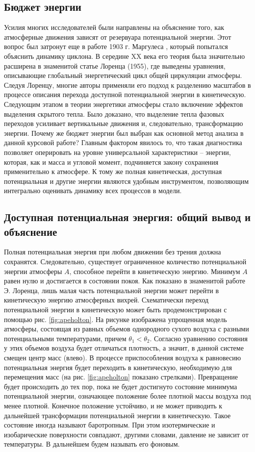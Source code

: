 \documentclass[12pt,a4paper]{report}
\begin{document}
\subsection{Бюджет энергии}
Усилия многих исследователей были направлены на объяснение того, как атмосферные движения зависят от резервуара потенциальной энергии. Этот вопрос был затронут еще в работе 1903 г. Маргулеса \citep{Nagata1993}, который попытался объяснить динамику циклона. В середине XX века его теория была значительно расширена в знаменитой статье Лоренца (1955), где выведены уравнения, описывающие глобальный энергетический цикл общей циркуляции атмосферы. Следуя Лоренцу, многие авторы применяли его подход к разделению масштабов в процессе описания перехода доступной потенциальной энергии в кинетическую. Следующим этапом в теории энергетики атмосферы стало включение эффектов выделения скрытого тепла. Было доказано, что выделение тепла фазовых переходов усиливает вертикальные движения и, следовательно, трансформацию энергии.
Почему же бюджет энергии был выбран как основной метод анализа в данной курсовой работе? Главным фактором явилось то, что такая диагностика позволяет оперировать на уровне универсальной характеристики -- энергии, которая, как и масса и угловой момент, подчиняется закону сохранения применительно к атмосфере. К тому же полная кинетическая, доступная потенциальная и другие энергии являются удобным инструментом, позволяющим интегрально оценивать динамику всех процессов в модели.

\subsection{Доступная потенциальная энергия: общий вывод и объяснение}
\label{sec:APEtheory}
Полная потенциальная энергия при любом движении без трения должна сохранятся. Следовательно, существует ограниченное количество потенциальной энергии атмосферы $A$, способное перейти в кинетическую энергию. Минимум $A$ равен нулю и достигается в состоянии покоя. Как показано в знаменитой работе Э. Лоренца, лишь малая часть потенциальной энергии может перейти в кинетическую энергию атмосферных вихрей. Схематически переход потенциальной энергии в кинетическую может быть продемонстрирован с помощью рис. \ref{fig:apeholton}. На рисунке изображена упрощенная модель атмосферы, состоящая из равных объемов однородного сухого воздуха с разными потенциальными температурами, причем $\theta_1 < \theta_2$. Согласно уравнению состояния у этих объемов воздуха будет отличаться плотность, а значит, в данной системе смещен центр масс (влево). В процессе приспособления воздуха к равновесию потенциальная энергия будет переходить в кинетическую, необходимую для перемещения масс (на рис.  \ref{fig:apeholton} показано стрелками). Превращение будет происходить до тех пор, пока не будет достигнуто состояние минимума потенциальной энергии, означающее положение более плотной массы воздуха под менее плотной. Конечное положение устойчиво, и не может приводить к дальнейшей трансформации потенциальной энергии в кинетическую. Такое состояние иногда называют баротропным. При этом изотермические и изобарические поверхности совпадают, другими словами, давление не зависит от температуры. В дальнейшем будем называть его фоновым.
\end{document}
